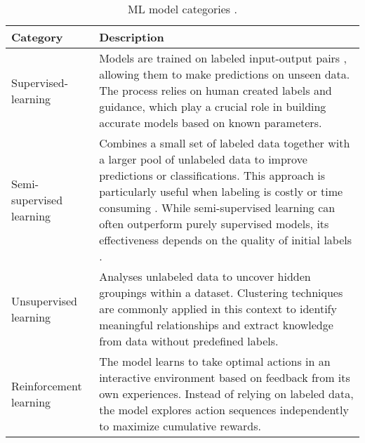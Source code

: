 \begin{table}[htbp]
  \centering
  \begin{tabularx}{\linewidth}{@{}lX@{}}
    \toprule
    \textbf{Category}        & \textbf{Description}                                                                                                                                                                                                                                                                                                                                                      \\
    \midrule
    Supervised-learning      & Models are trained on labeled input-output pairs , allowing them to make predictions on unseen data. The process relies on human created labels and guidance, which play a crucial role in building accurate models based on known parameters.                                                                                                                            \\
    \addlinespace
    Semi-supervised learning & Combines a small set of labeled data together with a larger pool of unlabeled data to improve predictions or classifications. This approach is particularly useful when labeling is costly or time consuming . While semi-supervised learning can often outperform purely supervised models, its effectiveness depends on the quality of initial labels \cite{zhou:2021}. \\
    \addlinespace
    Unsupervised learning    & Analyses unlabeled data to uncover hidden groupings within a dataset. Clustering techniques are commonly applied in this context to identify meaningful relationships and extract knowledge from data without predefined labels.\cite{wu:2022}                                                                                                                            \\
    \addlinespace
    Reinforcement learning   & The model learns to take optimal actions in an interactive environment based on feedback from its own experiences. Instead of relying on labeled data, the model explores action sequences independently to maximize cumulative rewards. \cite{talaeikhoei:2023}                                                                                                          \\
    \bottomrule
  \end{tabularx}
  \caption{ML model categories \cite{khoei:2023}.}
  \label{tab:ml_model_categories}
\end{table}


